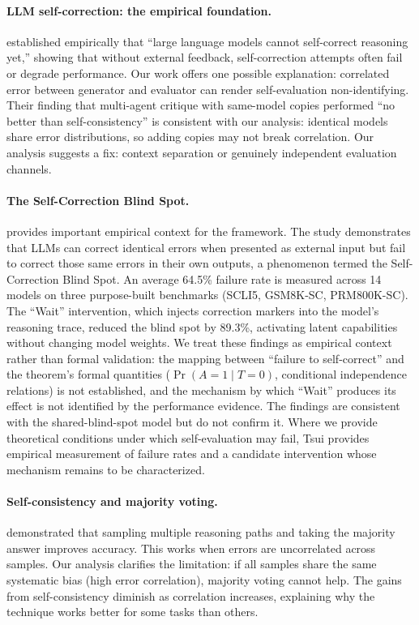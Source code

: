 \documentclass[11pt]{article}
\begin{document}
\paragraph{LLM self-correction: the empirical foundation.} \citet{huang2024selfcorrect}
established empirically that ``large language models cannot self-correct reasoning yet,''
showing that without external feedback, self-correction attempts often fail or degrade
performance. Our work offers one possible explanation: correlated error between generator and
evaluator can render self-evaluation non-identifying. Their finding that multi-agent critique
with same-model copies performed ``no better than self-consistency'' is consistent with our
analysis: identical models share error distributions, so adding copies may not break
correlation. Our analysis suggests a fix: context separation or genuinely independent
evaluation channels.

\paragraph{The Self-Correction Blind Spot.} \citet{tsui2025selfcorrection} provides
important empirical context for the framework. The study demonstrates that LLMs can correct
identical errors when presented as external input but fail to correct those same errors in
their own outputs, a phenomenon termed the Self-Correction Blind Spot. An average 64.5\%
failure rate is measured across 14 models on three purpose-built benchmarks (SCLI5,
GSM8K-SC, PRM800K-SC). The ``Wait'' intervention, which injects correction markers into
the model's reasoning trace, reduced the blind spot by 89.3\%, activating latent
capabilities without changing model weights. We treat these findings as empirical context
rather than formal validation: the mapping between ``failure to self-correct'' and the
theorem's formal quantities ($\Pr(A=1 \mid T=0)$, conditional independence relations) is
not established, and the mechanism by which ``Wait'' produces its effect is not identified
by the performance evidence. The findings are consistent with the shared-blind-spot model
but do not confirm it. Where we provide theoretical conditions under which self-evaluation
may fail, Tsui provides empirical measurement of failure rates and a candidate intervention
whose mechanism remains to be characterized.

\paragraph{Self-consistency and majority voting.} \citet{wang2023selfconsistency} demonstrated
that sampling multiple reasoning paths and taking the majority answer improves accuracy. This
works when errors are uncorrelated across samples. Our analysis clarifies the limitation: if
all samples share the same systematic bias (high error correlation), majority voting cannot
help. The gains from self-consistency diminish as correlation increases, explaining why the
technique works better for some tasks than others.
\end{document}
